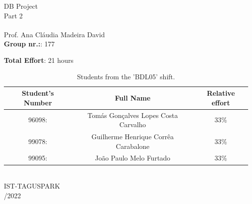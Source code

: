 \begin{center}
\vspace{5.0cm}
%
{\FontLb DB Project} \\
\vspace{0.2cm}
%
{\FontMn Part 2} \\
\vspace{1.0cm}
{\FontLn \tlangCourse} \\
\vspace{0.3cm}
{\FontMn Prof. Ana Cláudia Madeira David} \\
\vspace{0.5cm}
\textbf{Group nr.:}: 177 \\
\begin{center}
\begin{table}[h!]
\centering
\textbf{Total Effort}: 21 hours \\
\vspace{0.6cm}
\begin{tabular}{||c c c||} 
 \hline
 Student's Number & Full Name & Relative effort  \\ [0.5ex] 
 \hline\hline
       96098: & Tomás Gonçalves Lopes Costa Carvalho & 33\% \\
       99078: & Guilherme Henrique Corrêa Carabalone & 33\% \\
       99095: & João Paulo Melo Furtado & 33\% \\

 \hline
\end{tabular}
\caption{Students from the 'BDL05' shift.}
\end{table}
\end{center}
    
\vspace{2.0cm}
{\FontMb \tlangDegree} \\
{\FontMb IST-TAGUSPARK} \\
\vspace{1.5cm}
{/2022} \\
\end{center}